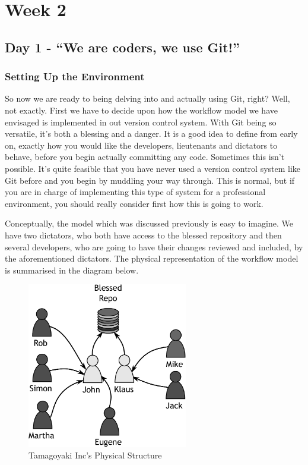 \chapter{Week 2}
\section{Day 1 - ``We are coders, we use Git!''}
\subsection{Setting Up the Environment}

So now we are ready to being delving into and actually using Git, right?  Well, not exactly.  First we have to decide upon how the workflow model we have envisaged is implemented in out version control system.  With Git being so versatile, it's both a blessing and a danger.  It is a good idea to define from early on, exactly how you would like the developers, lieutenants and dictators to behave, before you begin actually committing any code.  Sometimes this isn't possible.  It's quite feasible that you have never used a version control system like Git before and you begin by muddling your way through.  This is normal, but if you are in charge of implementing this type of system for a professional environment, you should really consider first how this is going to work. 

Conceptually, the model which was discussed previously is easy to imagine.  We have two dictators, who both have access to the blessed repository and then several developers, who are going to have their changes reviewed and included, by the aforementioned dictators.  The physical representation of the workflow model is summarised in the diagram below.

\begin{figure}[bt]
\centering
\includegraphics[width=7cm]{images/f-w2-d1.pdf}
\caption{Tamagoyaki Inc's Physical Structure}
\end{figure}

